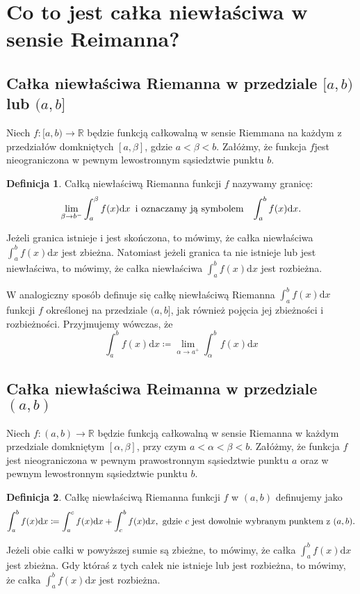 \documentclass{article}
\theoremstyle{definition}
\newtheorem{definition}{Definicja}[section]
\theoremstyle{case}
\begin{document}
\section{Co to jest całka niewłaściwa w sensie Reimanna?}

\subsection{Całka niewłaściwa Riemanna w przedziale $[a,b)$ lub $(a,b]$}
Niech ${f \colon [a,b) \to \mathbb{R}}$ będzie funkcją całkowalną w sensie Riemmana
	na każdym z przedziałów domkniętych ${[a,\beta]}$,
	gdzie $a < \beta < b$.
	Załóżmy, że funkcja $f$jest nieograniczona w pewnym lewostronnym sąsiedztwie punktu $b$.
	\begin{definition}
		\label{def.1}
		Całką niewłaściwą Riemanna funkcji $f$ nazywamy granicę:
		\begin{equation*}
			\lim_{\beta \to b^-} \int _a ^{\beta} f(x) \mathrm{d}x
			\textnormal{\enskip i oznaczamy ją symbolem \enskip}
			\int_a^b f(x) \mathrm{d}x
			\textnormal{.}
		\end{equation*}
	\end{definition}

	Jeżeli granica istnieje i jest skończona, to mówimy,
	że całka niewłaściwa ${\int_a^b f(x) \mathrm{d}x }$ jest zbieżna.
	Natomiast jeżeli granica ta nie istnieje lub jest niewłaściwa, to mówimy,
	że całka niewłaściwa ${\int_a^b f(x) \mathrm{d}x}$ jest rozbieżna.

	W analogiczny sposób definuje się całkę niewłaściwą Riemanna
${\int_a^b f(x) \mathrm{d}x}$ funkcji $f$ określonej na przedziale ${(a,b]}$,
jak również pojęcia jej zbieżności i rozbieżności.
Przyjmujemy wówczas, że
\begin{equation*}
	\int_a^b f(x) \mathrm{d}x \coloneqq \lim_{\alpha \to a^+} \int_{\alpha}^b f(x) \mathrm{d}x
\end{equation*}

\subsection{Całka niewłaściwa Reimanna w przedziale $(a,b)$}
Niech ${f \colon (a, b) \to \mathbb{R}}$ będzie funkcją całkowalną w sensie Riemanna
w każdym przedziale domkniętym $[\alpha,\beta]$, przy czym $a < \alpha < \beta < b$.
Załóżmy, że funkcja $f$ jest nieograniczona w pewnym prawostronnym sąsiedztwie punktu $a$ oraz
w pewnym lewostronnym sąsiedztwie punktu $b$.
\begin{definition}
	\label{def.2}
	Całkę niewłaściwą Riemanna funkcji $f$ w $(a,b)$ definujemy jako
	\begin{equation*}
		\int_a^b f(x) \mathrm{d}x
		\coloneqq
		\int_a^c f(x) \mathrm{d}x + \int_c^b f(x) \mathrm{d}x
		\textnormal{,\enskip gdzie $c$ jest dowolnie wybranym punktem z $(a,b)$.}
	\end{equation*}
\end{definition}
Jeżeli obie całki w powyższej sumie są zbieżne, to mówimy,
że całka $\int_a^b f(x) \mathrm{d}x$ jest zbieżna.
Gdy któraś z tych całek nie istnieje lub jest rozbieżna, to mówimy,
że całka $\int_a^b f(x) \mathrm{d}x$ jest rozbieżna.
\end{document}
